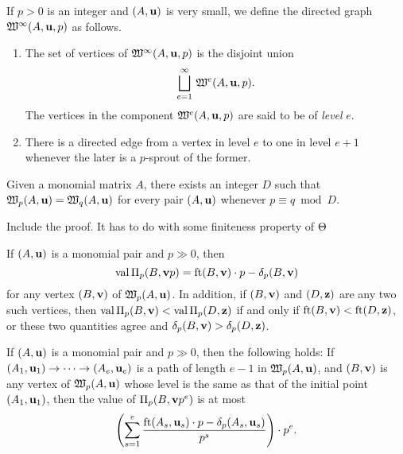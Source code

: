 \documentclass[11pt]{amsart}
\renewcommand{\!}[1]{{\color{red}\text{$\star$\,}#1\,$\star$}}
\begin{document}
\begin{definition}
If $p > 0$ is an integer and $(A, \mathbf{u})$ is very small, we define the directed graph $\mathfrak{W}^{\infty}(A, \mathbf{u}, p)$ as follows.
\begin{enumerate}
\item  The set of vertices of $\mathfrak{W}^{\infty}(A, \mathbf{u}, p)$ is the disjoint union \[ \bigsqcup_{e=1}^{\infty} \, \mathfrak{W}^e(A, \mathbf{u}, p).\]
The vertices in the component $\mathfrak{W}^e(A, \mathbf{u}, p)$ are said to be of \emph{level} $e$.  
\item  There is a directed edge from a vertex in level $e$ to one in level $e+1$ whenever the later is a $p$-sprout of the former.
\end{enumerate}
\end{definition}


\begin{proposition}
Given a monomial matrix $A$, there exists an integer $D$ such that $\mathfrak{W}_p(A, \mathbf{u}) = \mathfrak{W}_q(A, \mathbf{u})$ for every pair $(A, \mathbf{u})$ whenever $p \equiv q \bmod D$.
\end{proposition}

\alert[inline]{Include the proof.  It has to do with some finiteness property of $\Theta$}

\begin{corollary}
If $(A, \mathbf{u})$ is a monomial pair and $p \gg 0$, then
\[ \operatorname{val} \Pi_p(B, \mathbf{v}p) = \operatorname{ft}(B, \mathbf{v}) \cdot p - \delta_p(B, \mathbf{v}) \] for any vertex $(B, \mathbf{v})$ of $\mathfrak{W}_p(A, \mathbf{u})$.    In addition, if $(B, \mathbf{v})$ and $(D, \mathbf{z})$ are any two such vertices, then $\operatorname{val} \Pi_p(B, \mathbf{v}) < \operatorname{val} \Pi_p(D, \mathbf{z})$ if and only if $\operatorname{ft}(B, \mathbf{v}) < \operatorname{ft}(D, \mathbf{z})$, or these two quantities agree and $\delta_p(B, \mathbf{v}) > \delta_p(D, \mathbf{z})$.  
\end{corollary}


\begin{theorem}
If $(A, \mathbf{u})$ is a monomial pair and $p \gg 0$, then the following holds:  If 
$(A_1, \mathbf{u}_1) \to \cdots \to (A_e, \mathbf{u}_e)$ is a path of length $e-1$ in $\mathfrak{W}_p(A, \mathbf{u})$, and $(B, \mathbf{v})$ is any vertex of $\mathfrak{W}_p(A, \mathbf{u})$ whose level is the same as that of the initial point $(A_1, \mathbf{u}_1)$, then the value of $\Pi_p(B, \mathbf{v}p^e)$ is at most 
%
 \[ \left( \sum_{s=1}^e \frac{ \operatorname{ft}(A_s, \mathbf{u}_s)  \cdot p - \delta_p(A_s, \mathbf{u}_s)}{p^s} \right) \cdot p^e. \] 
\end{theorem}
\end{document}
